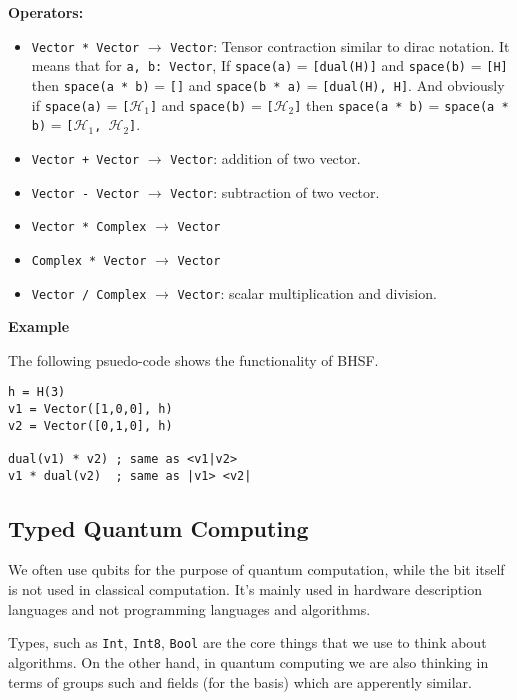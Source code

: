 \documentclass[a4paper,11pt]{article}
\def\co{\lstinline}
\begin{document}
\textbf{Operators: }

\begin{itemize}
    \item \co|Vector * Vector| \(\to\) \co|Vector|:
	    Tensor contraction similar to dirac notation. It means that for \co|a, b: Vector|,
	    If \co|space(a)| = \co|[dual(H)]| and \co|space(b)| = \co|[H]| then \co|space(a * b)| = \co|[]| and \co|space(b * a)| = \co|[dual(H), H]|. And obviously if \co|space(a)| = \co|[|\(\mathcal{H}_1\)\co|]|  and \co|space(b)| = \co|[|\(\mathcal{H}_2\)\co|]|
	    then \co|space(a * b)| = \co|space(a * b)| = \co|[|\(\mathcal{H}_1\)\co|, |\(\mathcal{H}_2\)\co|]|.
   \item \co|Vector + Vector| \(\to\) \co|Vector|: addition of two vector.
	\item \co|Vector - Vector| \(\to\) \co|Vector|: subtraction of two vector.
    \item \co|Vector * Complex| \(\to\) \co|Vector|
    \item \co|Complex * Vector| \(\to\) \co|Vector|
    \item \co|Vector / Complex| \(\to\) \co|Vector|: scalar multiplication and division.

\end{itemize}

\textbf{Example}

The following psuedo-code shows the functionality of BHSF.

\begin{lstlisting}
h = H(3)
v1 = Vector([1,0,0], h)
v2 = Vector([0,1,0], h)

dual(v1) * v2) ; same as <v1|v2>
v1 * dual(v2)  ; same as |v1> <v2|
\end{lstlisting}

\subsection{Typed Quantum Computing}

We often use qubits for the purpose of quantum computation, while the bit itself is not used in classical computation. It's mainly used in hardware description languages and not programming languages and algorithms.

Types, such as \co{Int}, \co{Int8}, \co{Bool} are the core things that we use to think about algorithms. On the other hand, in quantum computing we are also thinking in terms of groups such and fields (for the basis) which are apperently similar.
\end{document}
